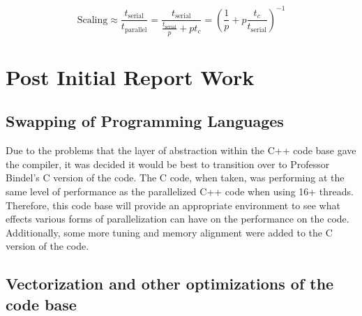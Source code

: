 \documentclass[12pt]{article}
\begin{document}
\begin{equation}
\mathrm{Scaling} \approx \frac{t_{\mathrm{serial}}}{t_{\mathrm{parallel}}} = \frac{t_{\mathrm{serial}}}{\frac{t_{\mathrm{serial}}}{p} + p t_c} = \left (\frac{1}{p}+p \frac{t_c}{t_{\mathrm{serial}}} \right)^{-1}
\label{exps}
\end{equation}

\newpage
\section{Post Initial Report Work}

\subsection{Swapping of Programming Languages}

Due to the problems that the layer of abstraction within the C++ code base gave the compiler, it was decided it would be best to transition over to Professor Bindel's C version of the code. The C code, when taken, was performing at the same level of performance as the parallelized C++ code when using 16+ threads.  Therefore, this code base will provide an appropriate environment to see what effects various forms of parallelization can have on the performance on the code. Additionally, some more tuning and memory alignment were added to the C version of the code.

\subsection{Vectorization and other optimizations of the code base}
\end{document}
